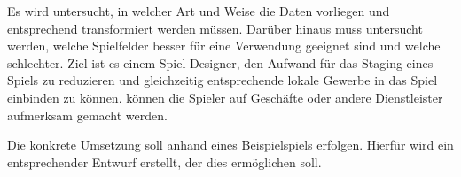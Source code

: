 Es wird untersucht, in welcher Art und Weise die Daten vorliegen und entsprechend transformiert werden müssen.
Darüber hinaus muss untersucht werden, welche Spielfelder besser für eine Verwendung geeignet sind und welche schlechter.
Ziel ist es einem Spiel Designer, den Aufwand für das Staging eines Spiels zu reduzieren und gleichzeitig entsprechende lokale Gewerbe in das Spiel einbinden zu können. können die Spieler auf Geschäfte oder andere Dienstleister aufmerksam gemacht werden.

Die konkrete Umsetzung soll anhand eines Beispielspiels erfolgen.
Hierfür wird ein entsprechender Entwurf erstellt, der dies ermöglichen soll.

